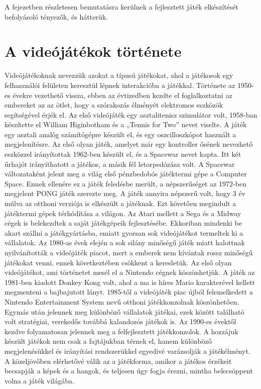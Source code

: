 
A fejezetben részletesen bemutatásra kerülnek a fejlesztett játék elkészítését befolyásoló tényezők, és hátterük. 

\section{A videójátékok története}
\label{videojatektortenet}


Videójátékoknak nevezzük azokat a típusú játékokat, ahol a játékosok egy felhasználói felületen keresztül lépnek interakcióba a játékkal. 
Története az 1950-es évekre vezethető vissza, ebben az évtizedben kezdte el foglalkoztatni az embereket az az ötlet, hogy a szórakozás élményét elektromos eszközök segítségével érjék el. 
Az első videójáték egy asztalitenisz szimulátor volt, 1958-ban készítette el William Higinbotham és a „Tennis for Two” nevet viselte. 
A játék egy asztali analóg számítógépre készült el, és egy oszcilloszkópot használt a megjelenítésre. 
Az első olyan játék, amelyet már egy kontroller ősének nevezhető eszközzel irányítottak 1962-ben készült el, és a Spacewar nevet kapta. 
Itt két űrhajót irányíthatott a játékos, a másik fél letorpedózása volt. 
A Spacewar változataként jelent meg a világ első pénzbedobós játéktermi gépe a Computer Space. 
Ennek ellenére ez a játék feledésbe merült, a népszerűséget az 1972-ben megjelent PONG játék szerezte meg. 
A játék annyira népszerű volt, hogy 3 év múlva az otthoni verziója is elkészült a játéknak. 
Ezt követően megindult a játéktermi gépek térhódítása a világon. 
Az Atari mellett a Sega és a Midway cégek is belekezdtek a saját játékgépeik fejlesztésébe. 
Ekkoriban mindenki be akart szállni a játékgyártásba, emiatt gyorsan sok videójátékot termeltek ki a vállalatok. 
Az 1980-as évek elején a sok silány minőségű játék miatt halottnak nyilvánították a videójáték piacot, mert a emberek nem kívántak rossz minőségű játékokat venni, ennek következtében csökkent a keresletük. 
Az első olyan videójátékot, ami történetet mesél el a Nintendo cégnek köszönhetjük. 
A játék az 1981-ben kiadott Donkey Kong volt, ahol a ma is híres Mario karakterével kellett megmenteni a bajbajutott lányt. 
1985-től a videójáték piac újból felemelkedett a Nintendo Entertainment System nevű otthoni játékkonzolnak köszönhetően. 
Egymás után jelennek meg különböző vállalatok játékai, ezek között található volt stratégiai, verekedős továbbá kalandozós játékok is. 
Az 1990-es évektől kezdve folyamatosan jelennek meg a felfejlesztett játékkonzolok. 
A hozzájuk készült játékok nem csak a fajtájukban térnek el, hanem különböző megjelenésükkel és irányítási rendszerükkel egyedivé varázsolják a játékélményt. 
A közeljövőben elérhetővé válik az a játékforma, amikor a játékos érzékeit becsapják a képek és a hangok, és teljesen úgy fogja érezni, mintha belecsöppent volna a játék világába. 


